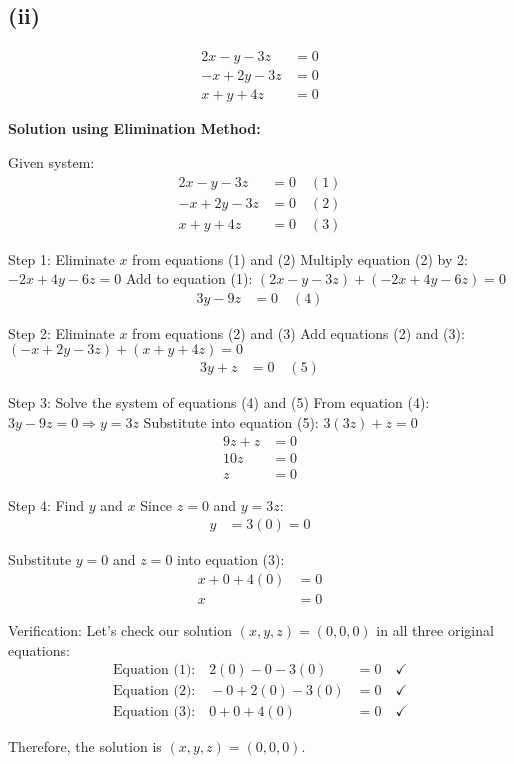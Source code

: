\subsection*{(ii)}
\begin{align*}
2x - y - 3z &= 0\\
-x + 2y - 3z &= 0\\
x + y + 4z &= 0
\end{align*}

\textbf{Solution using Elimination Method:}

Given system:
\begin{align}
2x - y - 3z &= 0 \quad (1)\\
-x + 2y - 3z &= 0 \quad (2)\\
x + y + 4z &= 0 \quad (3)
\end{align}

Step 1: Eliminate $x$ from equations (1) and (2)
Multiply equation (2) by 2: $-2x + 4y - 6z = 0$
Add to equation (1): $(2x - y - 3z) + (-2x + 4y - 6z) = 0$
\begin{align}
3y - 9z &= 0 \quad (4)
\end{align}

Step 2: Eliminate $x$ from equations (2) and (3)
Add equations (2) and (3): $(-x + 2y - 3z) + (x + y + 4z) = 0$
\begin{align}
3y + z &= 0 \quad (5)
\end{align}

Step 3: Solve the system of equations (4) and (5)
From equation (4): $3y - 9z = 0 \Rightarrow y = 3z$
Substitute into equation (5): $3(3z) + z = 0$
\begin{align*}
9z + z &= 0\\
10z &= 0\\
z &= 0
\end{align*}

Step 4: Find $y$ and $x$
Since $z = 0$ and $y = 3z$:
\begin{align*}
y &= 3(0) = 0
\end{align*}

Substitute $y = 0$ and $z = 0$ into equation (3):
\begin{align*}
x + 0 + 4(0) &= 0\\
x &= 0
\end{align*}

Verification: Let's check our solution $(x, y, z) = (0, 0, 0)$ in all three original equations:
\begin{align*}
\text{Equation (1):} \quad 2(0) - 0 - 3(0) &= 0 \quad \checkmark\\
\text{Equation (2):} \quad -0 + 2(0) - 3(0) &= 0 \quad \checkmark\\
\text{Equation (3):} \quad 0 + 0 + 4(0) &= 0 \quad \checkmark
\end{align*}

Therefore, the solution is $\boxed{(x, y, z) = (0, 0, 0)}$.